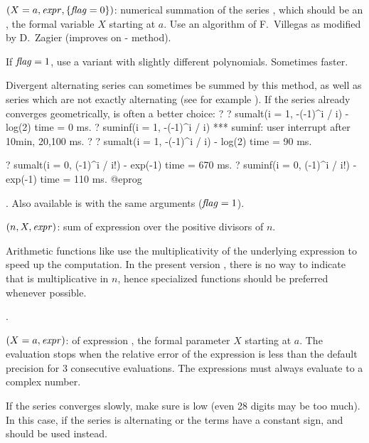 $(X=a,\hbox{\it expr\/},\{\hbox{\it f\kern0pt lag\/}=0\})$: numerical summation of the
series , which should be an , the formal
variable $X$ starting at $a$. Use an algorithm of F.~Villegas as modified by
D.~Zagier (improves on - method).

If $\hbox{\it f\kern0pt lag\/}=1$, use a variant with slightly different polynomials. Sometimes
faster.

Divergent alternating series can sometimes be summed by this method, as well
as series which are not exactly alternating (see for example
). If the series already converges geometrically,
 is often a better choice:
\bprog
? 
? sumalt(i = 1, -(-1)^i / i)  - log(2)
time = 0 ms.
? suminf(i = 1, -(-1)^i / i)
  *** suminf: user interrupt after 10min, 20,100 ms.
? 
? sumalt(i = 1, -(-1)^i / i)  - log(2)
time = 90 ms.

? sumalt(i = 0, (-1)^i / i!) - exp(-1)
time = 670 ms.
? suminf(i = 0, (-1)^i / i!) - exp(-1)
time = 110 ms.
@eprog

. Also
available is  with the same arguments ($\hbox{\it f\kern0pt lag\/} = 1$).

$(n,X,\hbox{\it expr\/})$: sum of expression  over
the positive divisors of $n$.

Arithmetic functions like  use the multiplicativity of the
underlying expression to speed up the computation. In the present version
\vers, there is no way to indicate that  is multiplicative in
$n$, hence specialized functions should be preferred whenever possible.

.

$(X=a,\hbox{\it expr\/})$:  of expression
, the formal parameter $X$ starting at $a$. The evaluation stops
when the relative error of the expression is less than the default precision
for 3 consecutive evaluations. The expressions must always evaluate to a
complex number.

If the series converges slowly, make sure  is low (even 28
digits may be too much). In this case, if the series is alternating or the
terms have a constant sign,  and  should be used
instead.

